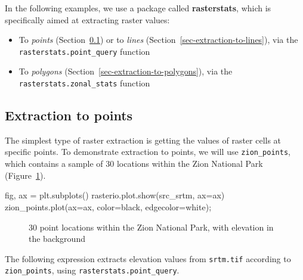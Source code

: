 \documentclass[
  letterpaper,
]{krantz}
\newenvironment{Shaded}{\begin{snugshade}}{\end{snugshade}}
\newcommand{\NormalTok}[1]{\textcolor[rgb]{0.00,0.23,0.31}{#1}}
\newcommand{\OperatorTok}[1]{\textcolor[rgb]{0.37,0.37,0.37}{#1}}
\newcommand{\StringTok}[1]{\textcolor[rgb]{0.13,0.47,0.30}{#1}}
\providecommand{\tightlist}{%
  \setlength{\itemsep}{0pt}\setlength{\parskip}{0pt}}\usepackage{longtable,booktabs,array}
\begin{document}
In the following examples, we use a package called \textbf{rasterstats},
which is specifically aimed at extracting raster values:

\begin{itemize}
\tightlist
\item
  To \emph{points} (Section~\ref{sec-extraction-to-points}) or to
  \emph{lines} (Section~\ref{sec-extraction-to-lines}), via the
  \texttt{rasterstats.point\_query} function
\item
  To \emph{polygons} (Section~\ref{sec-extraction-to-polygons}), via the
  \texttt{rasterstats.zonal\_stats} function
\end{itemize}

\subsection{Extraction to points}\label{sec-extraction-to-points}

The simplest type of raster extraction is getting the values of raster
cells at specific points. To demonstrate extraction to points, we will
use \texttt{zion\_points}, which contains a sample of 30 locations
within the Zion National Park (Figure~\ref{fig-zion-points}).

\begin{Shaded}
\begin{Highlighting}[]
\NormalTok{fig, ax }\OperatorTok{=}\NormalTok{ plt.subplots()}
\NormalTok{rasterio.plot.show(src\_srtm, ax}\OperatorTok{=}\NormalTok{ax)}
\NormalTok{zion\_points.plot(ax}\OperatorTok{=}\NormalTok{ax, color}\OperatorTok{=}\StringTok{\textquotesingle{}black\textquotesingle{}}\NormalTok{, edgecolor}\OperatorTok{=}\StringTok{\textquotesingle{}white\textquotesingle{}}\NormalTok{)}\OperatorTok{;}
\end{Highlighting}
\end{Shaded}

\begin{figure}[H]


\caption{\label{fig-zion-points}30 point locations within the Zion
National Park, with elevation in the background}

\end{figure}%

The following expression extracts elevation values from
\texttt{srtm.tif} according to \texttt{zion\_points}, using
\texttt{rasterstats.point\_query}.
\end{document}
